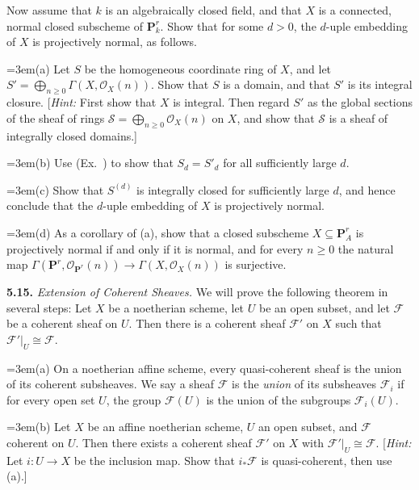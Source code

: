 {Now assume that $k$ is an algebraically closed field, and that $X$ is a \EditionText{}connected, normal closed subscheme of $\mathbf P_k^r$. Show that for some $d>0$, the $d$-uple embedding of $X$ is projectively normal, as follows.

\noindent\hangindent=3em\hspace*{1.7em}(a) Let $S$ be the homogeneous coordinate ring of $X$, and let $S'=\bigoplus_{n\ge0}\Gamma(X,\mathcal O_X(n))$. Show that $S$ is a domain, and that $S'$ is its integral closure. [\emph{Hint:} First show that $X$ is integral. Then regard $S'$ as the global sections of the sheaf of rings $\mathcal S=\bigoplus_{n\ge0}\mathcal O_X(n)$ on $X$, and show that $\mathcal S$ is a sheaf of integrally closed domains.]

\noindent\hangindent=3em\hspace*{1.7em}(b) Use (Ex.~) to show that $S_d=S'_d$ for all sufficiently large $d$.

\noindent\hangindent=3em\hspace*{1.7em}(c) Show that $S^{(d)}$ is integrally closed for sufficiently large $d$, and hence conclude that the $d$-uple embedding of $X$ is projectively normal.

\noindent\hangindent=3em\hspace*{1.7em}(d) As a corollary of (a), show that a closed subscheme $X\subseteq\mathbf P_A^r$ is projectively normal if and only if it is \EditionText{}normal, and for every $n\ge0$ the natural map $\Gamma(\mathbf P^r,\mathcal O_{\mathbf P^r}(n))\to\Gamma(X,\mathcal O_X(n))$ is surjective.

\smallskip
\noindent\hypertarget{ex-II-5.15}{}\textbf{5.15.} \emph{Extension of Coherent Sheaves.} We will prove the following theorem in several steps: Let $X$ be a noetherian scheme, let $U$ be an open subset, and let $\mathcal F$ be a coherent sheaf on $U$. Then there is a coherent sheaf $\mathcal F'$ on $X$ such that $\mathcal F'|_U\cong \mathcal F$.

\noindent\hangindent=3em\hspace*{1.7em}(a) On a noetherian affine scheme, every quasi-coherent sheaf is the union of its coherent subsheaves. We say a sheaf $\mathcal F$ is the \emph{union} of its subsheaves $\mathcal F_i$ if for every open set $U$, the group $\mathcal F(U)$ is the union of the subgroups $\mathcal F_i(U)$.

\noindent\hangindent=3em\hspace*{1.7em}(b) Let $X$ be an affine noetherian scheme, $U$ an open subset, and $\mathcal F$ coherent on $U$. Then there exists a coherent sheaf $\mathcal F'$ on $X$ with $\mathcal F'|_U\cong \mathcal F$. [\emph{Hint:} Let $i\colon U\to X$ be the inclusion map. Show that $i_*\mathcal F$ is quasi-coherent, then use (a).]}
